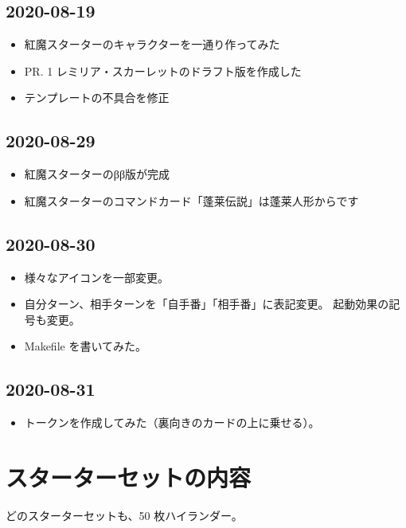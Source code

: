 \documentclass[line_length=22zw,number_of_lines=45,twocolumn]{jlreq}
\begin{document}
\subsection{2020-08-19}
\begin{itemize}
	\item 紅魔スターターのキャラクターを一通り作ってみた
	\item PR. 1 レミリア・スカーレットのドラフト版を作成した
	\item テンプレートの不具合を修正
\end{itemize}

\subsection{2020-08-29}
\begin{itemize}
	\item 紅魔スターターのββ版が完成
	\item 紅魔スターターのコマンドカード「蓬莱伝説」は蓬莱人形からです
\end{itemize}

\subsection{2020-08-30}
\begin{itemize}
	\item 様々なアイコンを一部変更。
	\item 自分ターン、相手ターンを「自手番」「相手番」に表記変更。
		起動効果の記号も変更。
	\item Makefile を書いてみた。
\end{itemize}

\subsection{2020-08-31}
\begin{itemize}
	\item トークンを作成してみた（裏向きのカードの上に乗せる）。
\end{itemize}

\section{スターターセットの内容}
どのスターターセットも、50 枚ハイランダー。
\clearpage\small
\end{document}
